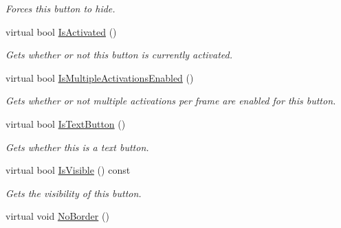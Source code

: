 \begin{DoxyCompactItemize}
\begin{DoxyCompactList}\small\item\em Forces this button to hide. \item\end{DoxyCompactList}\item 
virtual bool \hyperlink{classMezzanine_1_1UI_1_1Button_a1b64587eec4d23911c488edf40c7a0c7}{IsActivated} ()
\begin{DoxyCompactList}\small\item\em Gets whether or not this button is currently activated. \item\end{DoxyCompactList}\item 
virtual bool \hyperlink{classMezzanine_1_1UI_1_1Button_a4aff4ca86ab252ef8796a9cba203041e}{IsMultipleActivationsEnabled} ()
\begin{DoxyCompactList}\small\item\em Gets whether or not multiple activations per frame are enabled for this button. \item\end{DoxyCompactList}\item 
virtual bool \hyperlink{classMezzanine_1_1UI_1_1Button_a37a43c703a3f7bc8a59c8940ba53afe1}{IsTextButton} ()
\begin{DoxyCompactList}\small\item\em Gets whether this is a text button. \item\end{DoxyCompactList}\item 
virtual bool \hyperlink{classMezzanine_1_1UI_1_1Button_a8d8afe5870bcf5bf1de02ece187ab238}{IsVisible} () const 
\begin{DoxyCompactList}\small\item\em Gets the visibility of this button. \item\end{DoxyCompactList}\item 
\hypertarget{classMezzanine_1_1UI_1_1Button_ab72a24b501975cd5a60f671593158362}{
virtual void \hyperlink{classMezzanine_1_1UI_1_1Button_ab72a24b501975cd5a60f671593158362}{NoBorder} ()}
\label{classMezzanine_1_1UI_1_1Button_ab72a24b501975cd5a60f671593158362}


\end{DoxyCompactItemize}
